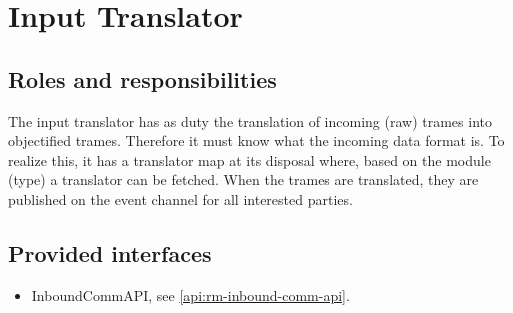 	\section{Input Translator}
\label{element:rm-input-translator}

\subsection{Roles and responsibilities}

\npar The input translator has as duty the translation of incoming (raw) trames
into objectified trames. Therefore it must know what the incoming data format
is. To realize this, it has a translator map at its disposal where, based on
the module (type) a translator can be fetched. When the trames are translated,
they are published on the event channel for all interested parties.

\subsection{Provided interfaces}

\begin{itemize}
  \item InboundCommAPI, see \ref{api:rm-inbound-comm-api}.
\end{itemize}